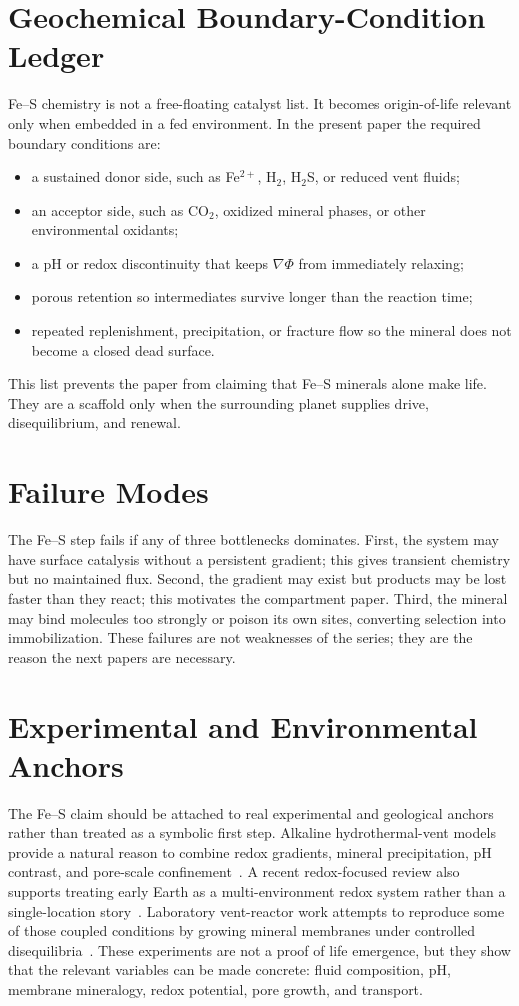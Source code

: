 \documentclass[11pt,a4paper]{article}
\begin{document}
\section{Geochemical Boundary-Condition Ledger}
Fe--S chemistry is not a free-floating catalyst list. It becomes origin-of-life relevant only when embedded in a fed environment. In the present paper the required boundary conditions are:
\begin{itemize}
\item a sustained donor side, such as Fe$^{2+}$, H$_2$, H$_2$S, or reduced vent fluids;
\item an acceptor side, such as CO$_2$, oxidized mineral phases, or other environmental oxidants;
\item a pH or redox discontinuity that keeps $\nabla\Phi$ from immediately relaxing;
\item porous retention so intermediates survive longer than the reaction time;
\item repeated replenishment, precipitation, or fracture flow so the mineral does not become a closed dead surface.
\end{itemize}
This list prevents the paper from claiming that Fe--S minerals alone make life. They are a scaffold only when the surrounding planet supplies drive, disequilibrium, and renewal.

\section{Failure Modes}
The Fe--S step fails if any of three bottlenecks dominates. First, the system may have surface catalysis without a persistent gradient; this gives transient chemistry but no maintained flux. Second, the gradient may exist but products may be lost faster than they react; this motivates the compartment paper. Third, the mineral may bind molecules too strongly or poison its own sites, converting selection into immobilization. These failures are not weaknesses of the series; they are the reason the next papers are necessary.

\section{Experimental and Environmental Anchors}
The Fe--S claim should be attached to real experimental and geological anchors rather than treated as a symbolic first step. Alkaline hydrothermal-vent models provide a natural reason to combine redox gradients, mineral precipitation, pH contrast, and pore-scale confinement~\cite{Russell1994,Martin2007,Sojo2016}. A recent redox-focused review also supports treating early Earth as a multi-environment redox system rather than a single-location story~\cite{Moldogazieva2026}. Laboratory vent-reactor work attempts to reproduce some of those coupled conditions by growing mineral membranes under controlled disequilibria~\cite{Barge2014}. These experiments are not a proof of life emergence, but they show that the relevant variables can be made concrete: fluid composition, pH, membrane mineralogy, redox potential, pore growth, and transport.
\end{document}
